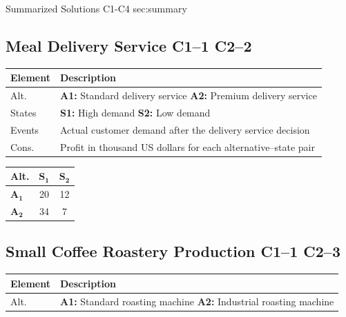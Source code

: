 	\sectionScored
	{Summarized Solutions}
	{C1-C4}
	{sec:summary}
	{
	\subsection{Meal Delivery Service \hfill C1--1 \quad C2--2}
	\begin{center}
		\begin{minipage}[t]{0.6\textwidth}
			\begin{tabularx}{\textwidth}
				{@{}p{1.5cm}>{\raggedright\arraybackslash}X@{}}
				\toprule
				Element & Description \\
				\midrule
				Alt. &
				\textbf{A1:} Standard delivery service \quad
				\textbf{A2:} Premium delivery service \\
				
				States &
				\textbf{S1:} High demand \quad
				\textbf{S2:} Low demand \\
				
				Events &
				Actual customer demand after the delivery service decision \\
				
				Cons. &
				Profit in thousand US dollars for each alternative--state pair \\
				\bottomrule
			\end{tabularx}
		\end{minipage}
		\hfill
		\begin{minipage}[t]{0.35\textwidth}
			\begin{center}
				\begin{tabular}{lcc}
					\toprule
					Alt. &  \(\mathbf{S_1}\) & \(\mathbf{S_2}\)\\
					\midrule
					\( \mathbf{A_1}\) & 20 & 12\\
					\(\mathbf{A_2}\) & 34 & 7\\
					\bottomrule
				\end{tabular}
			\end{center}
		\end{minipage}
	\end{center}
	
	\subsection{Small Coffee Roastery Production \hfill C1--1 \quad C2--3}
	\begin{center}
		\begin{minipage}[t]{0.55\textwidth}
			\begin{tabularx}{\textwidth}{
					@{}p{1.5cm}>{\raggedright\arraybackslash}X@{}
				}
				\toprule
				Element & Description \\
				\midrule
				Alt. &
				\textbf{A1:} Standard roasting machine \quad
				\textbf{A2:} Industrial roasting machine \\
				

\end{tabularx}
\end{minipage}
\end{center}}
